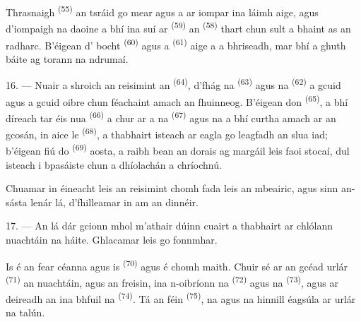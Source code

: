\VUsaut{3.0mm}

Thrasnaigh  \textsuperscript{(55)} an tsráid go mear agus
a  ar iompar ina láimh aige, agus d'iompaigh na daoine a bhí
ina suí ar  \textsuperscript{(59)} an 
\textsuperscript{(58)} thart chun sult a bhaint as an radharc. B'éigean d' bocht \textsuperscript{(60)} agus a  \textsuperscript{(61)}
aige a  a bhriseadh, mar bhí a ghuth báite ag torann na ndrumaí.

16. --- Nuair a shroich an reisimint an 
\textsuperscript{(64)}, d'fhág na  \textsuperscript{(63)} agus na
 \textsuperscript{(62)} a gcuid  agus a
gcuid oibre chun féachaint amach an fhuinneog. B'éigean don 
\textsuperscript{(65)}, a bhí díreach tar éis  nua
\textsuperscript{(66)} a chur ar a  na 
\textsuperscript{(67)} agus na  a bhí curtha amach ar an gcosán, in
aice le  \textsuperscript{(68)}, a thabhairt isteach ar
eagla go leagfadh an slua iad; b'éigean fiú do 
\textsuperscript{(69)} aosta, a raibh bean an dorais ag margáil leis faoi stocaí, dul
isteach i bpasáiste chun a dhíolachán a chríochnú.

Chuamar in éineacht leis an reisimint chomh fada leis an mbeairic,  agus
sinn an-sásta lenár lá, d'fhilleamar in am an dinnéir.

\VUsaut{3.0mm}

17. --- An lá dár gcionn mhol m'athair dúinn cuairt a thabhairt ar chlólann nuachtáin
na háite. Ghlacamar leis go fonnmhar.

Is  é an fear céanna agus is 
\textsuperscript{(70)}  
 agus  é chomh maith. Chuir sé ar an gcéad
urlár  \textsuperscript{(71)} an nuachtáin, agus an
 freisin, ina n-oibríonn na 
\textsuperscript{(72)} agus na  \textsuperscript{(73)}, agus
ar deireadh an  ina bhfuil na 
\textsuperscript{(74)}. Tá an  féin \textsuperscript{(75)}, na
 agus na hinnill éagsúla ar urlár na talún.

